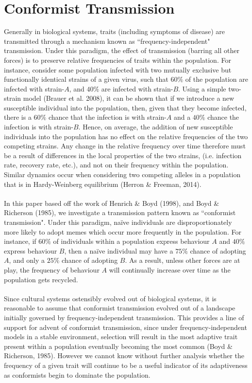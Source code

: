 \documentclass[a4paper,8pt]{extarticle}
\begin{document}
\section{Conformist Transmission}
Generally in biological systems, traits (including symptoms of disease) are transmitted through a mechanism known as ``frequency-independent" transmission. Under this paradigm, the effect of transmission (barring all other forces) is to preserve relative frequencies of traits within the population. For instance, consider some population infected with two mutually exclusive but functionally identical strains of a given virus, such that $60\%$ of the population are infected with strain-$A$, and $40\%$ are infected with strain-$B$. Using a simple two-strain model (Brauer et al. 2008), it can be shown that if we introduce a new susceptible individual into the population, then, given that they become infected, there is a $60\%$ chance that the infection is with strain-$A$ and a $40\%$ chance the infection is with strain-$B$. Hence, on average, the addition of new susceptible individuals into the population has no effect on the relative frequencies of the two competing strains. Any change in the relative frequency over time therefore must be a result of differences in the local properties of the two strains, (i.e. infection rate, recovery rate, etc.), and not on their frequency within the population. Similar dynamics occur when considering two competing alleles in a population that is in Hardy-Weinberg equilibrium (Herron \& Freeman, 2014). 
\\\\
In this paper based off the work of Henrich \& Boyd (1998), and Boyd \& Richerson (1985), we investigate a transmission pattern known as ``conformist transmission". Under this paradigm, naïve individuals are disproportionately more likely to adopt memes which occur more frequently in the population. For instance, if $60\%$ of individuals within a population express behaviour $A$ and $40\%$ express behaviour $B$, then a naïve individual may have a $75\%$ chance of adopting  $A$, and only a $25\%$ chance of adopting $B$. As a result, unless other forces are at play, the frequency of behaviour $A$ will continually increase over time as the population gets recycled.
\\\\
Since cultural systems ostensibly evolved out of biological systems, it is reasonable to assume that conformist transmission evolved out of a landscape initially governed by frequency-independent transmission. This provides a line of support for advent of conformist transmission, since under frequency-independent models in a stable environment, selection will result in the most adaptive trait present within a population eventually becoming the most common (Boyd \& Richerson, 1985). However we cannot know without further analysis whether the frequency of a given trait will continue to be a useful indicator of its adaptiveness as conformists begin to dominate the population.
\end{document}
